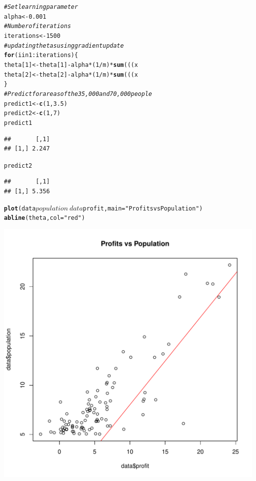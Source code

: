 \documentclass[12pt, a4paper, oneside]{article}\usepackage[]{graphicx}\usepackage[]{color}
\makeatletter
\def\maxwidth{ %
  \ifdim\Gin@nat@width>\linewidth
    \linewidth
  \else
    \Gin@nat@width
  \fi
}
\newcommand{\hlstr}[1]{\textcolor[rgb]{0.192,0.494,0.8}{#1}}%
\newcommand{\hlcom}[1]{\textcolor[rgb]{0.678,0.584,0.686}{\textit{#1}}}%
\newcommand{\hlkwd}[1]{\textcolor[rgb]{0.737,0.353,0.396}{\textbf{#1}}}%
\newenvironment{kframe}{%
 \def\at@end@of@kframe{}%
 \ifinner\ifhmode%
  \def\at@end@of@kframe{\end{minipage}}%
  \begin{minipage}{\columnwidth}%
 \fi\fi%
 \def\FrameCommand##1{\hskip\@totalleftmargin \hskip-\fboxsep
 \colorbox{shadecolor}{##1}\hskip-\fboxsep
     \hskip-\linewidth \hskip-\@totalleftmargin \hskip\columnwidth}%
 \MakeFramed {\advance\hsize-\width
   \@totalleftmargin\z@ \linewidth\hsize
   \@setminipage}}%
 {\par\unskip\endMakeFramed%
 \at@end@of@kframe}
\newenvironment{knitrout}{}{} %
\makeatother
\begin{document}
\begin{knitrout}
\color{fgcolor}\begin{kframe}
\begin{alltt}
\hlcom{# Set learning parameter}
alpha <- 0.001
\hlcom{# Number of iterations}
iterations <- 1500
\hlcom{# updating thetas using gradient update}
\hlkwd{for} (i in 1:iterations) \{
    theta[1] <- theta[1] - alpha * (1/m) * \hlkwd{sum}(((x %
    theta[2] <- theta[2] - alpha * (1/m) * \hlkwd{sum}(((x %
\}
\hlcom{# Predict for areas of the 35,000 and 70,000 people}
predict1 <- \hlkwd{c}(1, 3.5) %
predict2 <- \hlkwd{c}(1, 7) %
predict1
\end{alltt}
\begin{verbatim}
##       [,1]
## [1,] 2.247
\end{verbatim}
\begin{alltt}
predict2
\end{alltt}
\begin{verbatim}
##       [,1]
## [1,] 5.356
\end{verbatim}
\begin{alltt}
\hlkwd{plot}(data$population ~ data$profit, main = \hlstr{"Profits vs Population"})
\hlkwd{abline}(theta, col = \hlstr{"red"})
\end{alltt}
\end{kframe}
\includegraphics[width=\maxwidth]{figure/Regression3} 

\end{knitrout}
\end{document}
